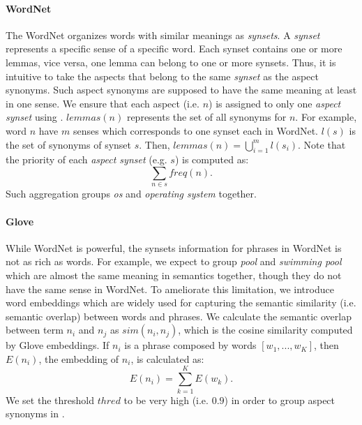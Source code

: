 \paragraph{WordNet}
The WordNet organizes words with similar meanings
as \textit{synsets}.
A \textit{synset} represents a specific sense of a specific word.
Each synset contains one or more lemmas, 
vice versa,
one lemma can belong to one or more synsets.
Thus, it is intuitive to take the aspects
that belong to the same \textit{synset} as the aspect synonyms.
Such aspect synonyms are supposed to have 
the same meaning at least in one sense.
We ensure that each aspect (i.e. $n$) is assigned to
only one \textit{aspect synset} using
.
$lemmas(n)$ represents the set of all synonyms 
for $n$.
For example, word $n$ have $m$ senses which corresponds to
one synset each in WordNet.
$l(s)$ is the set of synonyms of synset $s$.
Then, $lemmas(n)=\bigcup\limits_{i=1}^{m} l(s_i)$.
Note that 
the priority of each \textit{aspect synset} (e.g. $s$) is 
computed as: 
\begin{equation}
	\sum\limits_{n \in s}freq(n).
	\label{eq:priority}
\end{equation}
Such aggregation groups \textit{os} and \textit{operating system} together.

\paragraph{Glove}
While WordNet is powerful, the synsets information for phrases 
in WordNet is not as rich as words.
For example, we expect to group \textit{pool} and \textit{swimming pool} which are almost the same
meaning in semantics 
together, though they do not 
have the same sense in WordNet.
To ameliorate this limitation,
we introduce word embeddings
which are widely used for capturing the semantic similarity (i.e. semantic overlap)
between words and phrases.
We calculate the semantic overlap between term $n_i$ and $n_j$ as $sim(n_i, n_j)$, which is the cosine similarity 
computed by Glove embeddings. 
If $n_i$ is a phrase composed by words $[w_1, ..., w_K]$,
then $E(n_i)$, the embedding of $n_i$, 
is calculated as: 
\begin{equation}
	E(n_i) = \sum\limits_{k=1}^{K}E(w_k). 
	\label{eq:embedding}
\end{equation}
We set the threshold $thred$ to be very high (i.e.  $0.9$)
in order to group aspect synonyms in .

